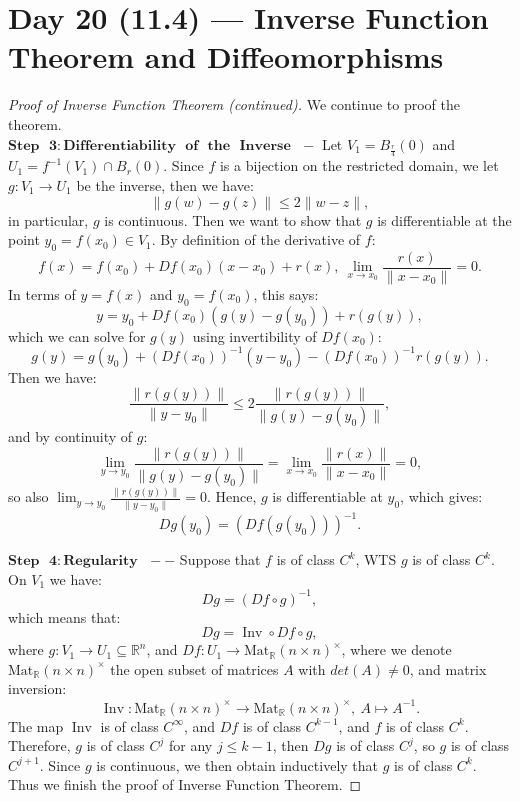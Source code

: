 \documentclass[11pt]{article}
\theoremstyle{quiet}
\theoremstyle{quietremark}
\begin{document}
\section{Day 20 (11.4) --- Inverse Function Theorem and Diffeomorphisms}
\begin{proof}[Proof of Inverse Function Theorem (continued)]
We continue to proof the theorem.\\

$\mathbf{Step\text{ }3: Differentiability\text{ }of\text{ }the\text{ }Inverse} \text{ }-$
Let $V_1=B_{\frac{r}{4}}(0)$ and $U_1=f^{-1}(V_1)\cap B_r(0)$. Since $f$ is a bijection on the restricted domain, we let $g:V_1\to U_1$ be the inverse, then we have:
\[
\|g(w)-g(z)\|\le 2\|w-z\|,
\]
in particular, $g$ is continuous. Then we want to show that $g$ is differentiable at the point $y_0=f(x_0)\in V_1$. By definition of the derivative of $f$:
\[
f(x)=f(x_0)+Df(x_0)(x-x_0)+r(x),~\lim_{x\to x_0}\frac{r(x)}{\|x-x_0\|}=0.
\]
In terms of $y=f(x)$ and $y_0=f(x_0)$, this says:
\[
y=y_0+Df(x_0)(g(y)-g(y_0))+r(g(y)),
\]
which we can solve for $g(y)$ using invertibility of $Df(x_0)$:
\[
g(y)=g(y_0)+(Df(x_0))^{-1}(y-y_0)-(Df(x_0))^{-1}r(g(y)).
\]
Then we have:
\[
\frac{\|r(g(y))\|}{\|y-y_0\|}\le 2\frac{\|r(g(y))\|}{\|g(y)-g(y_0)\|},
\]
and by continuity of $g$:
\[
\lim_{y\to y_0}\frac{\|r(g(y))\|}{\|g(y)-g(y_0)\|}=\lim_{x\to x_0}\frac{\|r(x)\|}{\|x-x_0\|}=0,
\]
so also $\displaystyle\lim_{y\to y_0}\frac{\|r(g(y))\|}{\|y-y_0\|}=0$. Hence, $g$ is differentiable at $y_0$, which gives:
\[
Dg(y_0)=(Df(g(y_0)))^{-1}.
\]

$\mathbf{Step\text{ }4:Regularity\text{ }--}$ Suppose that $f$ is of class $C^k$, WTS $g$ is of class $C^k$. On $V_1$ we have:
\[
Dg=(Df\circ g)^{-1},
\]
which means that:
\[
Dg=\operatorname{Inv}\circ Df\circ g,
\]
where $g:V_1\to U_1\subseteq\mathbb{R}^n$, and $Df:U_1\to\operatorname{Mat_\mathbb{R}}(n\times n)^\times$, where we denote $\operatorname{Mat_\mathbb{R}}(n\times n)^\times$ the open subset of matrices $A$ with $det(A)\ne 0$, and matrix inversion:
\[
\operatorname{Inv}:\operatorname{Mat_\mathbb{R}}(n\times n)^\times\to \operatorname{Mat_\mathbb{R}}(n\times n)^\times,~A\mapsto A^{-1}.
\]
The map $\operatorname{Inv}$ is of class $C^\infty$, and $Df$ is of class $C^{k-1}$, and $f$ is of class $C^k$. Therefore, $g$ is of class $C^j$ for any $j\le k-1$, then $Dg$ is of class $C^j$, so $g$ is of class $C^{j+1}$. Since $g$ is continuous, we then obtain inductively that $g$ is of class $C^k$. Thus we finish the proof of Inverse Function Theorem.
\end{proof}
\end{document}
